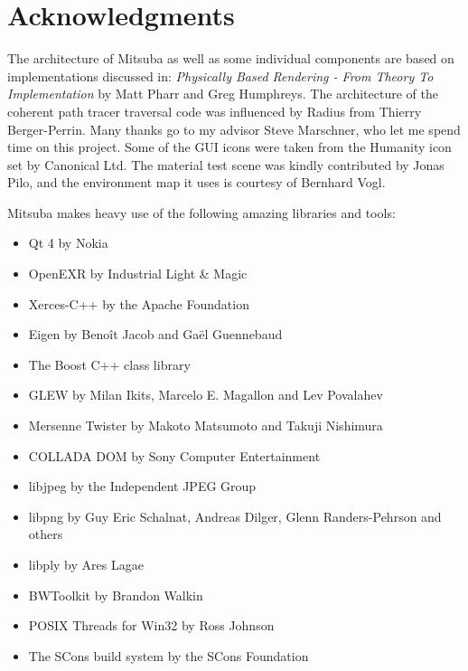 \section{Acknowledgments}
The architecture of Mitsuba as well as some individual components are based on implementations discussed in: \emph{Physically Based Rendering - From Theory To Implementation} by Matt Pharr and Greg Humphreys.
The architecture of the coherent path tracer traversal code was influenced by Radius from Thierry Berger-Perrin.
Many thanks go to my advisor Steve Marschner, who let me spend time on this project.
Some of the GUI icons were taken from the Humanity icon set by Canonical Ltd.
The material test scene was kindly contributed by Jonas Pilo, and the environment map
it uses is courtesy of Bernhard Vogl.

Mitsuba makes heavy use of the following amazing libraries and tools: 
\begin{itemize}
\item Qt 4 by Nokia
\item OpenEXR by Industrial Light \& Magic
\item Xerces-C+\!+ by the Apache Foundation
\item Eigen by Beno\^it Jacob and Ga\"el Guennebaud
\item The Boost C+\!+ class library
\item GLEW by Milan Ikits, Marcelo E. Magallon and Lev Povalahev
\item Mersenne Twister by Makoto Matsumoto and Takuji Nishimura
\item COLLADA DOM by Sony Computer Entertainment
\item libjpeg by the Independent JPEG Group
\item libpng by Guy Eric Schalnat, Andreas Dilger, Glenn Randers-Pehrson and \mbox{others}
\item libply by Ares Lagae
\item BWToolkit by Brandon Walkin
\item POSIX Threads for Win32 by Ross Johnson
\item The SCons build system by the SCons Foundation
\end{itemize}
